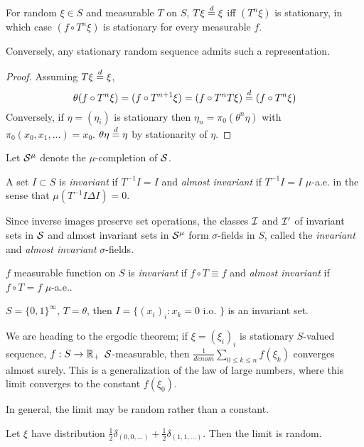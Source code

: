 \begin{lemma}
  For random $\xi \in S$ and measurable $T$ on $S$, $T \xi \overset{d}{=} \xi$
  iff $(T^n \xi)$ is stationary, in which case $(f \circ T^n \xi)$ is
  stationary for every measurable $f$.

  Conversely, any stationary random sequence admits such a representation.
\end{lemma}

\begin{proof}
  Assuming $T \xi \overset{d}{=} \xi$,
  \[
    \theta(f \circ T^n \xi)
    = (f \circ T^{n+1} \xi)
    = (f \circ T^n T \xi)
    \overset{d}{=} (f \circ T^n \xi)
  \]
  Conversely, if $\eta = (\eta_i)$ is stationary then
  $\eta_n = \pi_0(\theta^n \eta)$ with $\pi_0(x_0, x_1, \ldots) = x_0$.
  $\theta \eta \overset{d}{=} \eta$ by stationarity of $\eta$.
\end{proof}

Let $\mathcal{S}^\mu$ denote the $\mu$-completion of $\mathcal{S}$.

\begin{definition}
  A set $I \subset S$ is \emph{invariant} if $T^{-1} I = I$ and
  \emph{almost invariant} if $T^{-1} I = I$ $\mu$-a.e. in the sense
  that $\mu(T^{-1} I \Delta I) = 0$.

  Since inverse images preserve set operations, the classes
  $\mathcal{I}$ and $\mathcal{I}'$  of invariant sets in $\mathcal{S}$ and almost invariant
  sets in $\mathcal{S}^\mu$ form $\sigma$-fields in $S$, called the
  \emph{invariant} and \emph{almost invariant} $\sigma$-fields.

  $f$ measurable function on $S$ is \emph{invariant} if $f \circ T \equiv f$
  and \emph{almost invariant} if $f \circ T = f$ $\mu$-a.e..
\end{definition}

\begin{example}
  $S = \{0,1\}^\infty$, $T = \theta$, then
  $I = \{ (x_i)_i : x_k = 0 \text{ i.o. }\}$
  is an invariant set.
\end{example}

We are heading to the ergodic theorem; if $\xi = (\xi_i)_i$ is
stationary $S$-valued sequence, $f : S \to \mathbb{R}_+$ $\mathcal{S}$-measurable, then
$\frac{1}{denom} \sum_{0 \leq k \leq n} f(\xi_k)$ converges almost surely.
This is a generalization of the law of large numbers, where this
limit converges to the constant $f(\xi_0)$.

In general, the limit may be random rather than a constant.
\begin{example}
  Let $\xi$ have distribution
  $\frac{1}{2}\delta_{(0,0,\ldots)} + \frac{1}{2} \delta_{(1,1,\ldots)}$.
  Then the limit is random.
\end{example}

